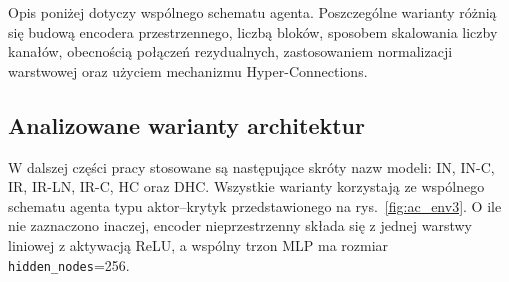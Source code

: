 Opis poniżej dotyczy wspólnego schematu agenta. Poszczególne warianty różnią się budową encodera przestrzennego, liczbą bloków, sposobem skalowania liczby kanałów, obecnością połączeń rezydualnych, zastosowaniem normalizacji warstwowej oraz użyciem mechanizmu Hyper-Connections.

\subsection{Analizowane warianty architektur}

W dalszej części pracy stosowane są następujące skróty nazw modeli:
IN, IN-C, IR, IR-LN, IR-C, HC oraz DHC.
Wszystkie warianty korzystają ze wspólnego schematu agenta typu aktor--krytyk
przedstawionego na rys.~\ref{fig:ac_env3}. O ile nie zaznaczono inaczej,
encoder nieprzestrzenny składa się z jednej warstwy liniowej z aktywacją ReLU,
a wspólny trzon MLP ma rozmiar \texttt{hidden\_nodes}=256.


